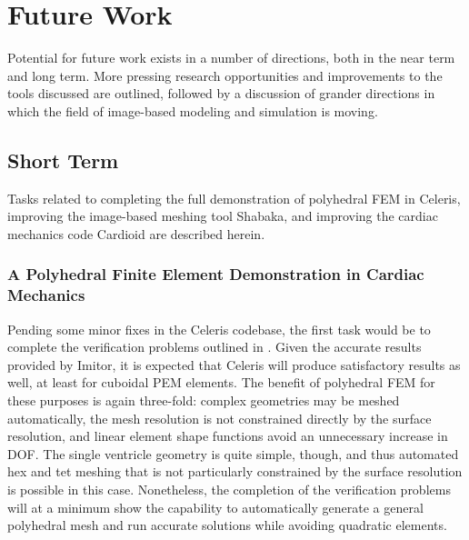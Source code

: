 \chapter{Future Work}
\label{chap:6}

Potential for future work exists in a number of directions, both in the near term and long term. More pressing research opportunities and improvements to the tools discussed are outlined, followed by a discussion of grander directions in which the field of image-based modeling and simulation is moving.

\section{Short Term}
\label{Short Term}

Tasks related to completing the full demonstration of polyhedral FEM in Celeris, improving the image-based meshing tool Shabaka, and improving the cardiac mechanics code Cardioid are described herein.

\subsection[A Polyhedral Finite Element Demonstration in Cardiac \\ Mechanics]{\texorpdfstring{A Polyhedral Finite Element Demonstration in Cardiac Mechanics}{A Polyhedral Finite Element Demonstration in Cardiac Mechanics}}
\label{A Polyhedral Finite Element Demonstration in Cardiac Mechanics}

Pending some minor fixes in the Celeris codebase, the first task would be to complete the verification problems outlined in . Given the accurate results provided by Imitor, it is expected that Celeris will produce satisfactory results as well, at least for cuboidal PEM elements. The benefit of polyhedral FEM for these purposes is again three-fold: complex geometries may be meshed automatically, the mesh resolution is not constrained directly by the surface resolution, and linear element shape functions avoid an unnecessary increase in DOF. The single ventricle geometry is quite simple, though, and thus automated hex and tet meshing that is not particularly constrained by the surface resolution is possible in this case. Nonetheless, the completion of the verification problems will at a minimum show the capability to automatically generate a general polyhedral mesh and run accurate solutions while avoiding quadratic elements.

